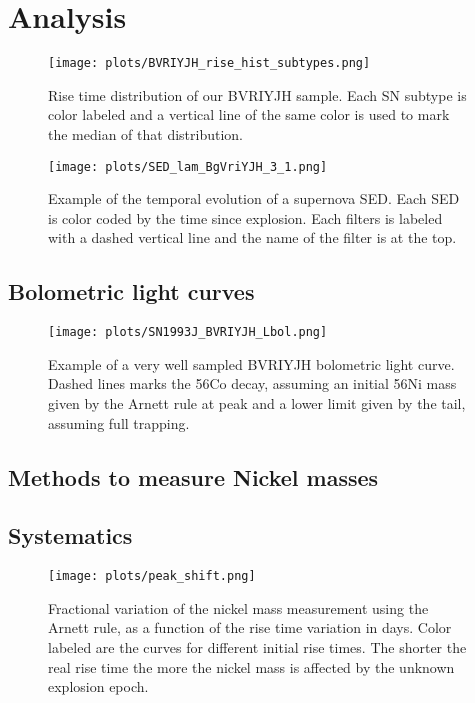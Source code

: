 \documentclass[onecolumn]{aa} %
\begin{document}
\section{Analysis}
\label{sec:analysis}

\begin{figure}[ht!]
 \centering
\texttt{[image: plots/BVRIYJH\_rise\_hist\_subtypes.png]}
\caption{Rise time distribution of our BVRIYJH sample. Each SN subtype is color labeled and a vertical line of the same color is used to mark the median of that distribution.\label{fig:rise_dist}}
\end{figure}


\begin{figure}[ht!]
 \centering
\texttt{[image: plots/SED\_lam\_BgVriYJH\_3\_1.png]}
\caption{Example of the temporal evolution of a supernova SED. Each SED is color coded by the time since explosion. Each filters is labeled with a dashed vertical line and the name of the filter is at the top.\label{fig:SED_example}}
\end{figure}



\subsection{Bolometric light curves}

\begin{figure}[ht!]
 \centering
\texttt{[image: plots/SN1993J\_BVRIYJH\_Lbol.png]}
\caption{Example of a very well sampled BVRIYJH bolometric light curve. Dashed lines marks the 56Co decay, assuming an initial 56Ni mass given by the Arnett rule at peak and a lower limit given by the tail, assuming full trapping.\label{fig:bol_example}}
\end{figure}

\subsection{Methods to measure Nickel masses}

\subsection{Systematics}
\begin{figure}[ht!]
 \centering
\texttt{[image: plots/peak\_shift.png]}
\caption{Fractional variation of the nickel mass measurement using the Arnett rule, as a function of the rise time variation in days. Color labeled are the curves for different initial rise times. The shorter the real rise time the more the nickel mass is affected by the unknown explosion epoch.\label{fig:peak_shift}}
\end{figure}
\end{document}
